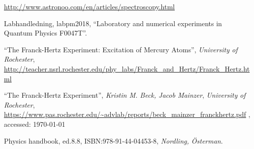 \begin{thebibliography}{99}
\label{sec:ref}

	\url{http://www.astronoo.com/en/articles/spectroscopy.html}
	
	Labhandledning, labpm2018, ``Laboratory and numerical experiments in Quantum Physics F0047T''.
	
	``The Franck-Hertz Experiment: Excitation of Mercury Atoms'', \emph{University of Rochester},
	\url{http://teacher.nsrl.rochester.edu/phy_labs/Franck_and_Hertz/Franck_Hertz.html}

	``The Franck-Hertz Experiment'', \emph{Kristin M. Beck, Jacob Mainzer}, \emph{University of Rochester},
	\url{https://www.pas.rochester.edu/~advlab/reports/beck_mainzer_franckhertz.pdf} , accessed: \today
	
	Physics handbook, ed.8.8, ISBN:978-91-44-04453-8, \emph{Nordling, Österman}.
	
\end{thebibliography}